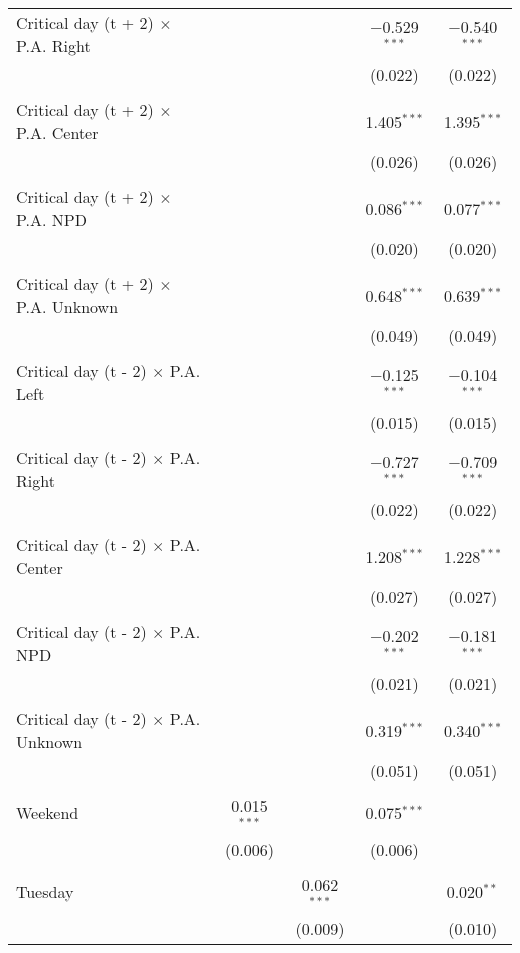 \documentclass[
]{article}
\begin{document}
\begin{table}[!htbp]
{\begin{tabular}{@{\extracolsep{5pt}}lcccc}
 Critical day (t + 2) $\times$ P.A. Right &  &  & $-$0.529$^{***}$ & $-$0.540$^{***}$ \\ 
  &  &  & (0.022) & (0.022) \\ 
  & & & & \\ 
 Critical day (t + 2) $\times$ P.A. Center &  &  & 1.405$^{***}$ & 1.395$^{***}$ \\ 
  &  &  & (0.026) & (0.026) \\ 
  & & & & \\ 
 Critical day (t + 2) $\times$ P.A. NPD &  &  & 0.086$^{***}$ & 0.077$^{***}$ \\ 
  &  &  & (0.020) & (0.020) \\ 
  & & & & \\ 
 Critical day (t + 2) $\times$ P.A. Unknown &  &  & 0.648$^{***}$ & 0.639$^{***}$ \\ 
  &  &  & (0.049) & (0.049) \\ 
  & & & & \\ 
 Critical day (t - 2) $\times$ P.A. Left &  &  & $-$0.125$^{***}$ & $-$0.104$^{***}$ \\ 
  &  &  & (0.015) & (0.015) \\ 
  & & & & \\ 
 Critical day (t - 2) $\times$ P.A. Right &  &  & $-$0.727$^{***}$ & $-$0.709$^{***}$ \\ 
  &  &  & (0.022) & (0.022) \\ 
  & & & & \\ 
 Critical day (t - 2) $\times$ P.A. Center &  &  & 1.208$^{***}$ & 1.228$^{***}$ \\ 
  &  &  & (0.027) & (0.027) \\ 
  & & & & \\ 
 Critical day (t - 2) $\times$ P.A. NPD &  &  & $-$0.202$^{***}$ & $-$0.181$^{***}$ \\ 
  &  &  & (0.021) & (0.021) \\ 
  & & & & \\ 
 Critical day (t - 2) $\times$ P.A. Unknown &  &  & 0.319$^{***}$ & 0.340$^{***}$ \\ 
  &  &  & (0.051) & (0.051) \\ 
  & & & & \\ 
 Weekend & 0.015$^{***}$ &  & 0.075$^{***}$ &  \\ 
  & (0.006) &  & (0.006) &  \\ 
  & & & & \\ 
 Tuesday &  & 0.062$^{***}$ &  & 0.020$^{**}$ \\ 
  &  & (0.009) &  & (0.010) \\ 

\end{tabular}}
\end{table}
\end{document}
